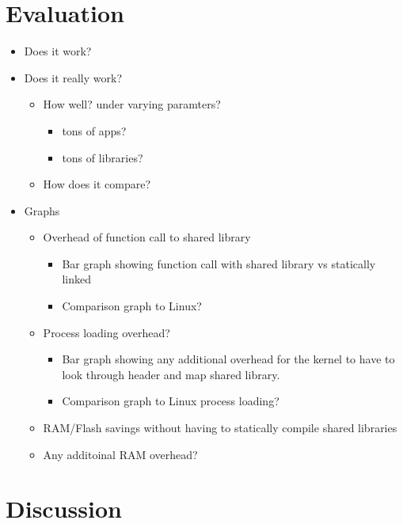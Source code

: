 \documentclass{article}
\begin{document}
\section*{Evaluation}
\begin{itemize}
    \item Does it work?
    \item Does it really work?
        \begin{itemize}
            \item How well? under varying paramters?
            \begin{itemize}
                \item tons of apps?
                \item tons of libraries?
            \end{itemize}
            \item How does it compare?
        \end{itemize}
    \item Graphs
        \begin{itemize}
            \item Overhead of function call to shared library
                \begin{itemize}
                    \item Bar graph showing function call with shared library vs statically linked
                    \item Comparison graph to Linux?
                \end{itemize}
            \item Process loading overhead? 
                \begin{itemize}
                    \item Bar graph showing any additional overhead for the kernel to have to look through header and map shared library. 
                    \item Comparison graph to Linux process loading?
                \end{itemize}
            \item RAM/Flash savings without having to statically compile shared libraries
            \item Any additoinal RAM overhead?
        \end{itemize}
\end{itemize}
\section*{Discussion}
\end{document}

